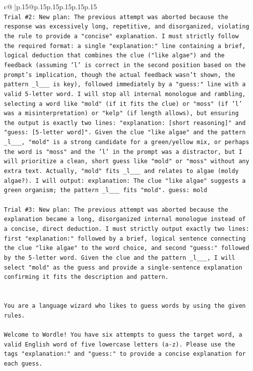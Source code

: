 \documentclass{article}
\begin{document}
{\begin{supertabular}{c@{$\;$}|p{.15\linewidth}@{}p{.15\linewidth}p{.15\linewidth}p{.15\linewidth}p{.15\linewidth}p{.15\linewidth}}
{{{\\ 
\texttt{Trial \#2: New plan: The previous attempt was aborted because the response was excessively long, repetitive, and disorganized, violating the rule to provide a "concise" explanation. I must strictly follow the required format: a single "explanation:" line containing a brief, logical deduction that combines the clue ("like algae") and the feedback (assuming 'l' is correct in the second position based on the prompt's implication, though the actual feedback wasn't shown, the pattern \_l\_\_\_ is key), followed immediately by a "guess:" line with a valid 5{-}letter word. I will stop all internal monologue and rambling, selecting a word like "mold" (if it fits the clue) or "moss" (if 'l' was a misinterpretation) or "kelp" (if length allows), but ensuring the output is exactly two lines: "explanation: {[}short reasoning{]}" and "guess: {[}5{-}letter word{]}". Given the clue "like algae" and the pattern \_l\_\_\_, "mold" is a strong candidate for a green/yellow mix, or perhaps the word is "moss" and the 'l' in the prompt was a distractor, but I will prioritize a clean, short guess like "mold" or "moss" without any extra text. Actually, "mold" fits \_l\_\_\_ and relates to algae (moldy algae?). I will output: explanation: The clue "like algae" suggests a green organism; the pattern \_l\_\_\_ fits "mold". guess: mold} \\
\\ 
\texttt{Trial \#3: New plan: The previous attempt was aborted because the explanation became a long, disorganized internal monologue instead of a concise, direct deduction. I must strictly output exactly two lines: first "explanation:" followed by a brief, logical sentence connecting the clue "like algae" to the word choice, and second "guess:" followed by the 5{-}letter word. Given the clue and the pattern \_l\_\_\_, I will select "mold" as the guess and provide a single{-}sentence explanation confirming it fits the description and pattern.} \\
\\ 
\\ 
\texttt{You are a language wizard who likes to guess words by using the given rules.} \\
\\ 
\texttt{Welcome to Wordle! You have six attempts to guess the target word, a valid English word of five lowercase letters (a{-}z). Please use the tags "explanation:" and "guess:" to provide a concise explanation for each guess.} \\
\\ 
}}}
\end{supertabular}}
\end{document}
